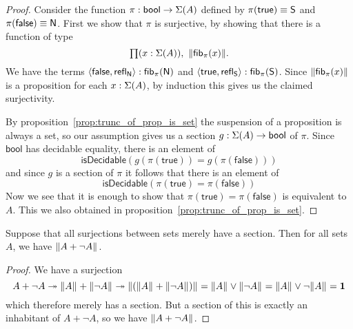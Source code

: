 \begin{proof}
Consider the function $\pi:\mathsf{bool}\to\Sigma(A)$ defined by 
$\pi(\mathsf{true})\equiv \mathsf{S}$ and $\pi(\mathsf{false})\equiv \mathsf{N}$. 
First  we  show that $\pi$ is surjective, 
by showing that there is a function of type
\begin{equation*}
\prd{x:\susp(A)} \|\hfiber\pi{x}\|.
\end{equation*}
We have the terms 
$\langle{\mathsf{false},\ensuremath{\mathsf{refl}_{\mathsf{N}}}}\rangle:\mathsf{fib}_{\pi}(\mathsf{N})$ 
and $\langle{\mathsf{true},\ensuremath{\mathsf{refl}_{\mathsf{S}}}}\rangle:\mathsf{fib}_{\pi}(\mathsf{S})$. 
Since $\|\mathsf{fib}_{\pi}(x)\|$ is a proposition for each 
$x:\Sigma(A)$, by induction this gives us the claimed surjectivity.

By proposition~\ref{prop:trunc_of_prop_is_set} the suspension of 
a proposition is always a set, so our assumption gives us a 
section $g:\Sigma(A)\to\mathsf{bool}$ of $\pi$. 
Since $\mathsf{bool}$ has decidable equality, there is an element of
\begin{equation*}
\mathsf{isDecidable}(g(\pi(\mathsf{true}))= g(\pi(\mathsf{false})))
\end{equation*}
and since $g$ is a section of $\pi$ it follows that there is an element of
\begin{equation*}
\mathsf{isDecidable}(\pi(\mathsf{true})=\pi(\mathsf{false}))
\end{equation*}
Now we see that it is enough to show that 
$\pi(\mathsf{true})= \pi(\mathsf{false})$ is equivalent to $A$. 
This we also obtained in proposition~\ref{prop:trunc_of_prop_is_set}.
\end{proof}

\begin{cor}\label{cor:ACtoLEM0}
Suppose that all surjections between sets merely have a section. Then for all sets $A$, we have $\Vert A + \neg A\Vert_{}$.
\end{cor}

\begin{proof}
  We have a surjection
\[
A + \neg A \twoheadrightarrow \Vert A\Vert_{} + \Vert \neg A\Vert_{} \twoheadrightarrow \Vert (\Vert A\Vert_{} + \Vert \neg A\Vert_{})\Vert_{} = \Vert A\Vert_{} \vee \Vert \neg A\Vert_{} = \Vert A\Vert_{} \vee \neg \Vert A\Vert_{} = \mathbf{1}
\]
which therefore merely has a section.
But a section of this is exactly an inhabitant of $A+\neg A$, so we have $\Vert A+\neg A\Vert_{}$.
\end{proof}

